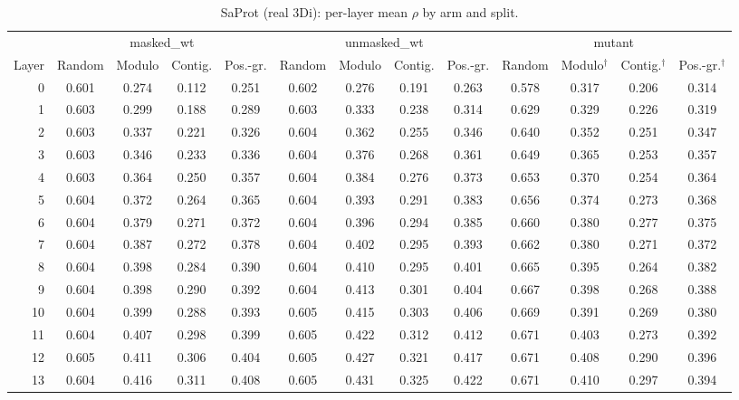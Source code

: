 \documentclass[11pt,a4paper]{article}
\begin{document}
\begin{landscape}\begin{table}[p]\centering\footnotesize
\caption{SaProt (real 3Di): per-layer mean $\rho$ by arm and split.}\label{tab:S7}
\begin{tabular}{rcccccccccccc}
\toprule
& \multicolumn{4}{c}{masked\_wt} & \multicolumn{4}{c}{unmasked\_wt} & \multicolumn{4}{c}{mutant} \\
\cmidrule(lr){2-5}\cmidrule(lr){6-9}\cmidrule(lr){10-13}
Layer & Random & Modulo & Contig. & Pos.-gr. & Random & Modulo & Contig. & Pos.-gr. & Random & Modulo$^{\dagger}$ & Contig.$^{\dagger}$ & Pos.-gr.$^{\dagger}$ \\
\midrule
0 & 0.601 & 0.274 & 0.112 & 0.251 & 0.602 & 0.276 & 0.191 & 0.263 & 0.578 & 0.317 & 0.206 & 0.314 \\
1 & 0.603 & 0.299 & 0.188 & 0.289 & 0.603 & 0.333 & 0.238 & 0.314 & 0.629 & 0.329 & 0.226 & 0.319 \\
2 & 0.603 & 0.337 & 0.221 & 0.326 & 0.604 & 0.362 & 0.255 & 0.346 & 0.640 & 0.352 & 0.251 & 0.347 \\
3 & 0.603 & 0.346 & 0.233 & 0.336 & 0.604 & 0.376 & 0.268 & 0.361 & 0.649 & 0.365 & 0.253 & 0.357 \\
4 & 0.603 & 0.364 & 0.250 & 0.357 & 0.604 & 0.384 & 0.276 & 0.373 & 0.653 & 0.370 & 0.254 & 0.364 \\
5 & 0.604 & 0.372 & 0.264 & 0.365 & 0.604 & 0.393 & 0.291 & 0.383 & 0.656 & 0.374 & 0.273 & 0.368 \\
6 & 0.604 & 0.379 & 0.271 & 0.372 & 0.604 & 0.396 & 0.294 & 0.385 & 0.660 & 0.380 & 0.277 & 0.375 \\
7 & 0.604 & 0.387 & 0.272 & 0.378 & 0.604 & 0.402 & 0.295 & 0.393 & 0.662 & 0.380 & 0.271 & 0.372 \\
\midrule
8 & 0.604 & 0.398 & 0.284 & 0.390 & 0.604 & 0.410 & 0.295 & 0.401 & 0.665 & 0.395 & 0.264 & 0.382 \\
9 & 0.604 & 0.398 & 0.290 & 0.392 & 0.604 & 0.413 & 0.301 & 0.404 & 0.667 & 0.398 & 0.268 & 0.388 \\
10 & 0.604 & 0.399 & 0.288 & 0.393 & 0.605 & 0.415 & 0.303 & 0.406 & 0.669 & 0.391 & 0.269 & 0.380 \\
11 & 0.604 & 0.407 & 0.298 & 0.399 & 0.605 & 0.422 & 0.312 & 0.412 & 0.671 & 0.403 & 0.273 & 0.392 \\
12 & 0.605 & 0.411 & 0.306 & 0.404 & 0.605 & 0.427 & 0.321 & 0.417 & 0.671 & 0.408 & 0.290 & 0.396 \\
13 & 0.604 & 0.416 & 0.311 & 0.408 & 0.605 & 0.431 & 0.325 & 0.422 & 0.671 & 0.410 & 0.297 & 0.394 \\

\end{tabular}
\end{table}
\end{landscape}
\end{document}
